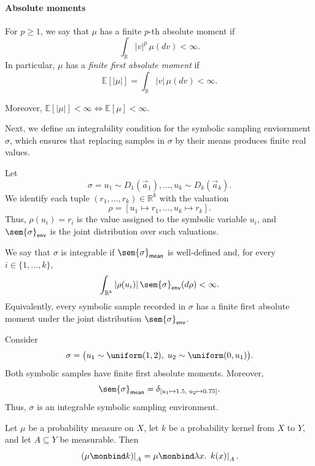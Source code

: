 \paragraph{Absolute moments}
For $p\geq1$, we say that $\mu$ has a finite $p$-th absolute moment if
\[
  \int_{\mathbb R}|v|^p\,\mu(dv)<\infty.
\]
In particular, $\mu$ has a \emph{finite first absolute moment} if
\[
  \mathbb E[|\mu|] = \int_{\mathbb R}|v|\,\mu(dv)<\infty.
\]

Moreover, $\mathbb E[|\mu|] < \infty \iff \mathbb E[\mu] < \infty$. 

Next, we define an integrability condition for the symbolic sampling enviornment $\sigma$, which ensures that replacing samples in $\sigma$ by their means produces finite real values.

\begin{definition}
  Let
  \[
    \sigma
    =
    u_1\sim D_1(\vec a_1),\ldots,
    u_k\sim D_k(\vec a_k).
  \]
  We identify each tuple $(r_1,\ldots,r_k)\in\mathbb R^k$ with the
  valuation
  \[
    \rho
    =
    [u_1\mapsto r_1,\ldots,u_k\mapsto r_k].
  \]
  Thus, $\rho(u_i)=r_i$ is the value assigned to the symbolic variable
  $u_i$, and $\sem{\sigma}_{\mathsf{env}}$ is the joint distribution
  over such valuations.

  We say that $\sigma$ is integrable if
  $\sem{\sigma}_{\mathsf{mean}}$ is well-defined and, for every
  $i\in\{1,\ldots,k\}$,
  \[
    \int_{\mathbb R^k}
      |\rho(u_i)|\,
      \sem{\sigma}_{\mathsf{env}}(d\rho)
    <
    \infty.
  \]
  Equivalently, every symbolic sample recorded in $\sigma$ has a
  finite first absolute moment under the joint distribution
  $\sem{\sigma}_{\mathsf{env}}$.
\end{definition}

\begin{example}
  Consider
  \[
    \sigma
    =
    \bigl(
      u_1\sim\uniform(1,2),\;
      u_2\sim\uniform(0,u_1)
    \bigr).
  \]
  Both symbolic samples have finite first absolute moments. Moreover,
  \[
    \sem{\sigma}_{\mathsf{mean}}
    =
    \delta_{[u_1\mapsto 1.5,\;u_2\mapsto 0.75]}.
  \]
  Thus, $\sigma$ is an integrable symbolic sampling environment.
\end{example}

\begin{lemma}
  \label{lem:restriction-of-bind}
  Let $\mu$ be a probability measure on $X$, let $k$ be a probability
  kernel from $X$ to $Y$, and let $A\subseteq Y$ be measurable. Then
  \[
    \left.(\mu\monbind k)\right|_A
    =
    \mu\monbind
    \lambda x.\,
    \left.k(x)\right|_A.
  \]
\end{lemma}

